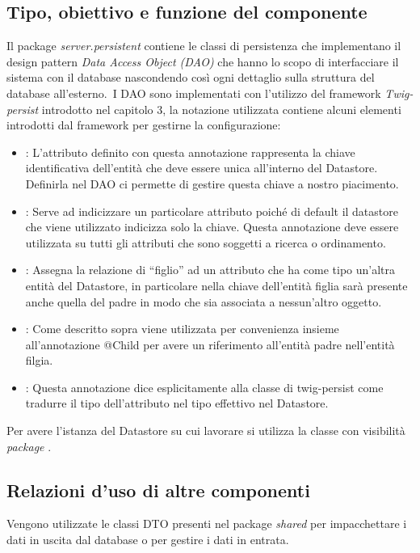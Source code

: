 \subsection*{Tipo, obiettivo e funzione del componente}
Il package \emph{server.persistent} contiene le classi di persistenza che
implementano il design pattern \emph{Data Access Object (DAO)} che hanno lo
scopo di interfacciare il sistema con il database nascondendo cos\`i ogni
dettaglio sulla struttura del database all'esterno.\
I DAO sono implementati con l'utilizzo del framework \emph{Twig-persist}
introdotto nel capitolo 3, la notazione utilizzata contiene alcuni elementi
introdotti dal framework per gestirne la configurazione: 
\begin{itemize}
  \item {}: L'attributo definito con questa annotazione rappresenta la
  chiave identificativa dell'entit\`a che deve essere unica all'interno del
  Datastore. Definirla nel DAO ci permette di gestire questa chiave a nostro
  piacimento.
  \item {}: Serve ad indicizzare un particolare attributo poich\'e di
  default il datastore che viene utilizzato indicizza solo la chiave. Questa
  annotazione deve essere utilizzata su tutti gli attributi che sono soggetti a
  ricerca o ordinamento.
  \item {}: Assegna la relazione di ``figlio'' ad un attributo
  che ha come tipo un'altra entit\`a del Datastore, in particolare nella chiave
  dell'entit\`a figlia sar\`a presente anche quella del padre in modo che sia
  associata a nessun'altro oggetto.
  \item {}: Come descritto sopra viene utilizzata per convenienza
  insieme all'annotazione @Child per avere un riferimento all'entit\`a padre
  nell'entit\`a filgia.
  \item {}: Questa annotazione dice esplicitamente alla
  classe di twig-persist \co{ObjectFieldTraslator} come tradurre il tipo dell'attributo
  nel tipo effettivo nel Datastore.
\end{itemize}
Per avere l'istanza del Datastore su cui lavorare si
utilizza la classe con visibilit\`a \emph{package} . \subsection*{Relazioni d'uso di altre componenti} Vengono utilizzate le classi
DTO presenti nel package \emph{shared} per impacchettare i dati in uscita dal
database o per gestire i dati in entrata. 
